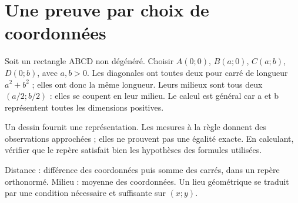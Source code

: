 \documentclass[../cours_2de.tex]{subfiles}
\begin{document}
\section{Une preuve par choix de coordonnées}
Soit un rectangle ABCD non dégénéré. Choisir $A(0;0)$, $B(a;0)$, $C(a;b)$, $D(0;b)$, avec $a,b>0$. Les diagonales ont toutes deux pour carré de longueur $a^2+b^2$ ; elles ont donc la même longueur. Leurs milieux sont tous deux $(a/2;b/2)$ : elles se coupent en leur milieu. Le calcul est général car a et b représentent toutes les dimensions positives.
\begin{attention}
Un dessin fournit une représentation. Les mesures à la règle donnent des observations approchées ; elles ne prouvent pas une égalité exacte. En calculant, vérifier que le repère satisfait bien les hypothèses des formules utilisées.
\end{attention}
\begin{retenir}
Distance : différence des coordonnées puis somme des carrés, dans un repère orthonormé. Milieu : moyenne des coordonnées. Un lieu géométrique se traduit par une condition nécessaire et suffisante sur $(x;y)$.
\end{retenir}
\end{document}
